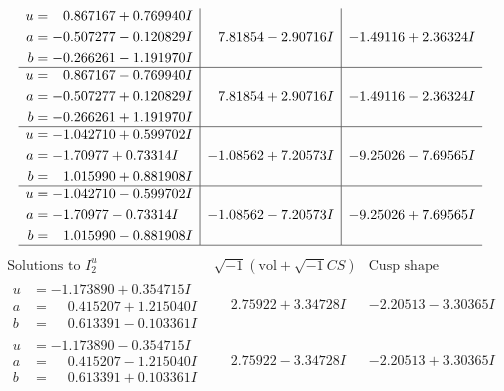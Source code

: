 \documentclass[1p]{elsarticle_modified}
\theoremstyle{definition}
\newcommand{\I}{\sqrt{-1}}
\begin{document}
$$\begin{array}{c|c|c}
\begin{aligned}
u &= \phantom{-}0.867167 + 0.769940 I \\
a &= -0.507277 - 0.120829 I \\
b &= -0.266261 - 1.191970 I\end{aligned}
 & \phantom{-}7.81854 - 2.90716 I & -1.49116 + 2.36324 I \\ \hline\begin{aligned}
u &= \phantom{-}0.867167 - 0.769940 I \\
a &= -0.507277 + 0.120829 I \\
b &= -0.266261 + 1.191970 I\end{aligned}
 & \phantom{-}7.81854 + 2.90716 I & -1.49116 - 2.36324 I \\ \hline\begin{aligned}
u &= -1.042710 + 0.599702 I \\
a &= -1.70977 + 0.73314 I \\
b &= \phantom{-}1.015990 + 0.881908 I\end{aligned}
 & -1.08562 + 7.20573 I & -9.25026 - 7.69565 I \\ \hline\begin{aligned}
u &= -1.042710 - 0.599702 I \\
a &= -1.70977 - 0.73314 I \\
b &= \phantom{-}1.015990 - 0.881908 I\end{aligned}
 & -1.08562 - 7.20573 I & -9.25026 + 7.69565 I\\
 \hline 
 \end{array}$$\newpage$$\begin{array}{c|c|c}  
\text{Solutions to }I^u_{2}& \I (\text{vol} + \sqrt{-1}CS) & \text{Cusp shape}\\
 \hline 
\begin{aligned}
u &= -1.173890 + 0.354715 I \\
a &= \phantom{-}0.415207 + 1.215040 I \\
b &= \phantom{-}0.613391 - 0.103361 I\end{aligned}
 & \phantom{-}2.75922 + 3.34728 I & -2.20513 - 3.30365 I \\ \hline\begin{aligned}
u &= -1.173890 - 0.354715 I \\
a &= \phantom{-}0.415207 - 1.215040 I \\
b &= \phantom{-}0.613391 + 0.103361 I\end{aligned}
 & \phantom{-}2.75922 - 3.34728 I & -2.20513 + 3.30365 I \\ \hline\begin{aligned}

\end{aligned}
\end{array}$$
\end{document}
